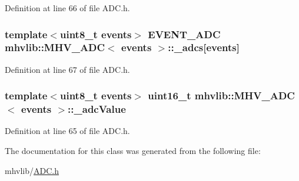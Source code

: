 Definition at line 66 of file A\-D\-C.\-h.

\hypertarget{classmhvlib_1_1_m_h_v___a_d_c_ac609defda994e5906c9da367c0b73421}{
\subsubsection[{\-\_\-adcs}]{\setlength{\rightskip}{0pt plus 5cm}template$<$uint8\-\_\-t events$>$ {\bf E\-V\-E\-N\-T\-\_\-\-A\-D\-C} {\bf mhvlib\-::\-M\-H\-V\-\_\-\-A\-D\-C}$<$ events $>$\-::\-\_\-adcs\mbox{[}events\mbox{]}\hspace{0.3cm}{\ttfamily [protected]}}}\label{classmhvlib_1_1_m_h_v___a_d_c_ac609defda994e5906c9da367c0b73421}


Definition at line 67 of file A\-D\-C.\-h.

\hypertarget{classmhvlib_1_1_m_h_v___a_d_c_a45146902f9579f70532abca2b6ff4855}{
\subsubsection[{\-\_\-adc\-Value}]{\setlength{\rightskip}{0pt plus 5cm}template$<$uint8\-\_\-t events$>$ uint16\-\_\-t {\bf mhvlib\-::\-M\-H\-V\-\_\-\-A\-D\-C}$<$ events $>$\-::\-\_\-adc\-Value\hspace{0.3cm}{\ttfamily [protected]}}}\label{classmhvlib_1_1_m_h_v___a_d_c_a45146902f9579f70532abca2b6ff4855}


Definition at line 65 of file A\-D\-C.\-h.



The documentation for this class was generated from the following file\-:\begin{DoxyCompactItemize}
\item 
mhvlib/\hyperlink{_a_d_c_8h}{A\-D\-C.\-h}\end{DoxyCompactItemize}
